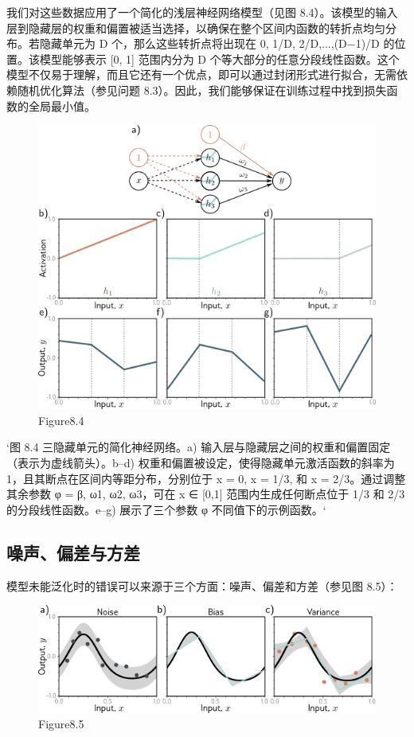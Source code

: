我们对这些数据应用了一个简化的浅层神经网络模型（见图 8.4）。该模型的输入层到隐藏层的权重和偏置被适当选择，以确保在整个区间内函数的转折点均匀分布。若隐藏单元为 D 个，那么这些转折点将出现在 0, 1/D, 2/D,...,(D−1)/D 的位置。该模型能够表示 [0, 1] 范围内分为 D 个等大部分的任意分段线性函数。这个模型不仅易于理解，而且它还有一个优点，即可以通过封闭形式进行拟合，无需依赖随机优化算法（参见问题 8.3）。因此，我们能够保证在训练过程中找到损失函数的全局最小值。

\begin{figure}[h!]
\centering
\includegraphics[width=0.7\linewidth]{png/chapter8/PerfModel.png}
\caption{Figure8.4}
\end{figure}

`图 8.4 三隐藏单元的简化神经网络。a) 输入层与隐藏层之间的权重和偏置固定（表示为虚线箭头）。b–d) 权重和偏置被设定，使得隐藏单元激活函数的斜率为 1，且其断点在区间内等距分布，分别位于 x = 0, x = 1/3, 和 x = 2/3。通过调整其余参数 φ = {β, ω1, ω2, ω3}，可在 x ∈ [0,1] 范围内生成任何断点位于 1/3 和 2/3 的分段线性函数。e–g) 展示了三个参数 φ 不同值下的示例函数。`
\subsection{噪声、偏差与方差}
模型未能泛化时的错误可以来源于三个方面：噪声、偏差和方差（参见图 8.5）：

\begin{figure}[h!]
\centering
\includegraphics[width=0.7\linewidth]{png/chapter8/PerfNoiseBiasVariance.png}
\caption{Figure8.5}
\end{figure}

